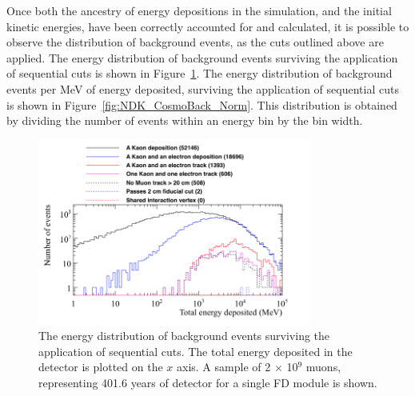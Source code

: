 Once both the ancestry of energy depositions in the simulation, and the initial kinetic energies, have been correctly accounted for and calculated, it is possible to observe the distribution of background events, as the cuts outlined above are applied. The energy distribution of background events surviving the application of sequential cuts is shown in Figure~\ref{fig:NDK_CosmoBack_Raw}. The energy distribution of background events per MeV of energy deposited, surviving the application of sequential cuts is shown in Figure~\ref{fig:NDK_CosmoBack_Norm}. This distribution is obtained by dividing the number of events within an energy bin by the bin width. \\

\begin{figure}
  \centering
  \includegraphics[width=0.8\textwidth]{CosmicBackground_EnergyDepCuts_Raw_2cmCut}
  \caption[The energy distribution of background events surviving the application of sequential cuts.]
          {The energy distribution of background events surviving the application of sequential cuts. The total energy deposited in the detector is plotted on the $x$ axis. A sample of 2 $\times$ 10$^9$ muons, representing 401.6 years of detector for a single FD module is shown.}
  \label{fig:NDK_CosmoBack_Raw}
\end{figure}

